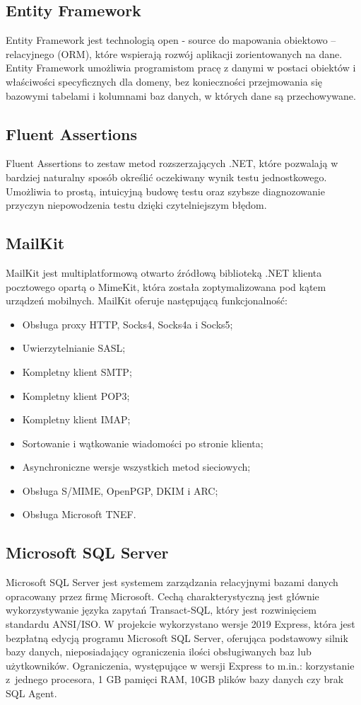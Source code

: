 \documentclass[12pt,a4paper]{article}
\begin{document}
		\subsection{Entity Framework}		 
		 	\indent Entity Framework jest technologią open - source do mapowania obiektowo – relacyjnego (ORM), które wspierają rozwój aplikacji zorientowanych na dane.
		 	Entity Framework umożliwia programistom pracę z danymi w postaci obiektów i właściwości specyficznych dla domeny, bez konieczności przejmowania się bazowymi
		 	tabelami i kolumnami baz danych, w których dane są przechowywane. 

		\subsection{Fluent Assertions}
			\indent Fluent Assertions to zestaw metod rozszerzających .NET, które pozwalają
			w bardziej naturalny sposób określić oczekiwany wynik testu jednostkowego.
			Umożliwia to prostą, intuicyjną budowę testu oraz szybsze diagnozowanie przyczyn
			niepowodzenia testu dzięki czytelniejszym błędom.

		\subsection{MailKit}
			\indent MailKit jest multiplatformową otwarto źródłową biblioteką .NET klienta pocztowego opartą o MimeKit, która została zoptymalizowana pod kątem urządzeń mobilnych.
			MailKit oferuje następującą funkcjonalność:
			\begin{itemize}
				\item Obsługa proxy HTTP, Socks4, Socks4a i Socks5;
				\item Uwierzytelnianie SASL;
				\item Kompletny klient SMTP;
				\item Kompletny klient POP3;
				\item Kompletny klient IMAP;
				\item Sortowanie i wątkowanie wiadomości po stronie klienta;
				\item Asynchroniczne wersje wszystkich metod sieciowych;
				\item Obsługa S/MIME, OpenPGP, DKIM i ARC;
				\item Obsługa Microsoft TNEF.
			\end{itemize}

		\subsection{Microsoft SQL Server}		 
		 	\indent Microsoft SQL Server jest systemem zarządzania relacyjnymi bazami danych opracowany przez firmę Microsoft. Cechą charakterystyczną jest głównie wykorzystywanie języka
		 	zapytań	Transact-SQL, który jest rozwinięciem standardu ANSI/ISO. W projekcie wykorzystano wersje 2019 Express, która jest bezpłatną edycją programu Microsoft SQL Server, oferująca
		 	podstawowy silnik bazy danych, nieposiadający ograniczenia ilości obsługiwanych baz lub użytkowników. Ograniczenia, występujące w wersji Express to  m.in.:
		 	korzystanie z~jednego procesora, 1 GB pamięci RAM, 10GB plików bazy danych czy brak SQL Agent.
			
\end{document}
